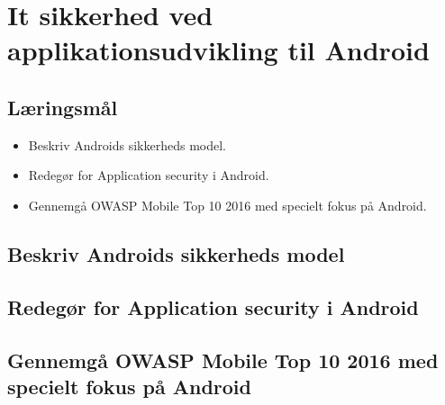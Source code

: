 \section{It sikkerhed ved applikationsudvikling til Android}

\subsection{Læringsmål}

\begin{itemize}
	\item Beskriv Androids sikkerheds model.
	\item Redegør for Application security i Android.
	\item Gennemgå OWASP Mobile Top 10 2016 med specielt fokus på Android.
\end{itemize}

\subsection{Beskriv Androids sikkerheds model}
\subsection{Redegør for Application security i Android}
\subsection{Gennemgå OWASP Mobile Top 10 2016 med specielt fokus på Android}
